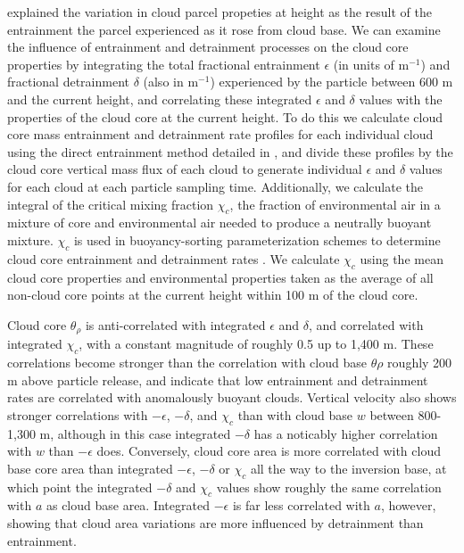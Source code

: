 \documentclass[acp]{copernicus}
\begin{document}
\cite{Romps2010} explained the variation in cloud parcel propeties at height 
as the result of the entrainment the parcel experienced as it rose from 
cloud base.  We can examine the influence of entrainment and detrainment 
processes on the cloud core properties by integrating the total fractional 
entrainment $\epsilon$ (in units of m$^{-1}$) and fractional detrainment 
$\delta$ (also in m$^{-1}$) experienced by the particle between 600 m and the 
current height, and correlating these integrated $\epsilon$ and $\delta$ 
values with the properties of the cloud core at the current height.  To do this 
we calculate cloud core mass entrainment and detrainment rate profiles for each 
individual cloud using the direct entrainment method detailed in 
\cite{Dawe2011}, and divide these profiles by the cloud core vertical mass 
flux of each cloud to generate individual $\epsilon$ and $\delta$ values for 
each cloud at each particle sampling time.  Additionally, we calculate the 
integral of the critical mixing fraction $\chi_c$, the fraction of 
environmental air in a mixture of core and environmental air needed to produce 
a neutrally buoyant mixture.  $\chi_c$ is used in buoyancy-sorting 
parameterization schemes to determine cloud core entrainment and detrainment 
rates \citep{Kain1990, Rooy2008}.  We calculate $\chi_c$ using the mean cloud
core properties and environmental properties taken as the average of all 
non-cloud core points at the current height within 100 m of the cloud core.

Cloud core $\theta_\rho$ is anti-correlated with integrated $\epsilon$ and 
$\delta$, and correlated with integrated $\chi_c$, with a constant magnitude 
of roughly 0.5 up to 1,400 m. These correlations become stronger than the 
correlation with cloud base $\theta\rho$ roughly 200 m above particle 
release, and indicate that low entrainment and detrainment rates are correlated 
with anomalously buoyant clouds.  Vertical velocity also shows stronger 
correlations with $-\epsilon$, $-\delta$, and $\chi_c$ than with cloud base 
$w$ between 800-1,300 m, although in this case integrated $-\delta$ has a 
noticably higher correlation with $w$ than $-\epsilon$ does.  Conversely, 
cloud core area is more correlated with cloud base core area than integrated 
$-\epsilon$, $-\delta$ or $\chi_c$ all the way to the inversion base, at 
which point the integrated $-\delta$ and $\chi_c$ values show roughly the 
same correlation with $a$ as cloud base area.  Integrated $-\epsilon$ is far 
less correlated with $a$, however, showing that cloud area variations are more 
influenced by detrainment than entrainment.
\end{document}
